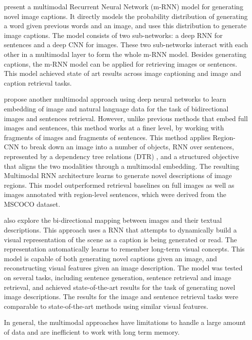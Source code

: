 \citet{Mao2014, Mao2015_mRNN} present a multimodal Recurrent Neural Network (m-RNN) model for generating novel image captions. It directly models the probability distribution of generating a word given previous words and an image, and uses this distribution to generate image captions. The model consists of two sub-networks: a deep RNN for sentences and a deep CNN for images. These two sub-networks interact with each other in a multimodal layer to form the whole m-RNN model. Besides generating captions, the m-RNN model can be applied for retrieving images or sentences. This model achieved state of art results across image captioning and image and caption retrieval tasks.

\citet{Karpathy2015} propose another multimodal approach using deep neural networks to learn embedding of image and natural language data for the task of bidirectional images and sentences retrieval. However, unlike previous methods that embed full images and sentences, this method works at a finer level, by working with fragments of images and fragments of sentences. This method applies Region-CNN to break down an image into a number of objects, RNN over sentences, represented by a dependency tree relations (DTR) \citep{DeMarneffe2006}, and a structured objective that aligns the two modalities through a multimodal embedding. The resulting Multimodal RNN architecture learns to generate novel descriptions of image regions. This model outperformed retrieval baselines on full images as well as images annotated with region-level sentences, which were derived from the MSCOCO dataset.
 
\citet{Chen2015} also explore the bi-directional mapping between images and their textual descriptions. This approach uses a RNN that attempts to dynamically build a visual representation of the scene as a caption is being generated or read. The representation automatically learns to remember long-term visual concepts. This model is capable of both generating novel captions given an image, and reconstructing visual features given an image description. The model was tested on several tasks, including sentence generation, sentence retrieval and image retrieval, and achieved state-of-the-art results for the task of generating novel image descriptions. The results for the image and sentence retrieval tasks were comparable to state-of-the-art methods using similar visual features.

In general, the multimodal approaches have limitations to handle a large amount of data and are inefficient to work with long term memory.

